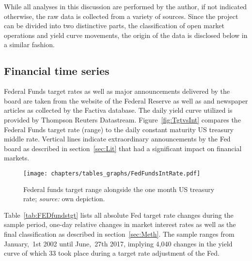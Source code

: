 
While all analyses in this discussion are performed by the author, if not indicated otherwise, the raw data is collected from a variety of sources. Since the project can be divided into two distinctive parts, the classification of open market operations and yield curve movements, the origin of the data is disclosed below in a similar fashion.

\subsection{Financial time series}
Federal Funds target rates as well as major announcements delivered by the board are taken from the website of the Federal Reserve \parencite{Fed.OMOs} as well as \textcite{Fawley.2013} and newspaper articles as collected by the Factiva database. The daily yield curve utilized is provided by Thompson Reuters Datastream. Figure~\vref{fig:TgtvsInt} compares the Federal Funds target rate (range) to the daily constant maturity US treasury middle rate. Vertical lines indicate extraordinary announcements by the Fed board as described in section~\ref{sec:Lit} that had a significant impact on financial markets.

\begin{figure}[htbp]
	\centering
		\texttt{[image: chapters/tables\_graphs/FedFundsIntRate.pdf]} 
	\caption[Federal funds target range alongside the one month US treasury rate.]{Federal funds target range alongside the one month US treasury rate; \textit{source:} own depiction.}
\label{fig:TgtvsInt}
\end{figure}
%
Table~\vref{tab:FEDfundstgt} lists all absolute Fed target rate changes during the sample period, one-day relative changes in market interest rates as well as the final classification as described in section~\ref{sec:Meth}. The sample ranges from January,~1st 2002 until June,~27th 2017, implying 4,040 changes in the yield curve of which 33 took place during a target rate adjustment of the Fed. 
%

%


